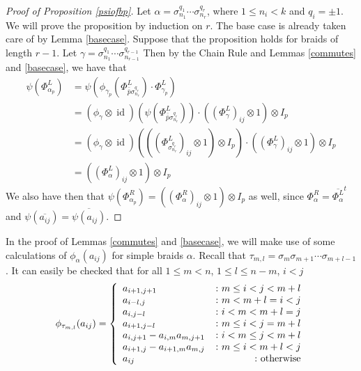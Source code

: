 \documentclass[11pt]{amsart}
\def\s{{\sigma}}
\def\fp{{\scriptstyle \bar{\bar{p}}}}
\newcommand\id{\operatorname{id}}
\theoremstyle{definition}
\begin{document}
\begin{proof} [Proof of Proposition \ref{psiofbp}]
Let $\alpha = \s_{n_1}^{q_1}\cdots\s_{n_r}^{q_r}$, where $1\le n_i<k$ and $q_i = \pm 1$.  We will prove the proposition by induction on $r$.  The base case is already taken care of by Lemma \ref{basecase}.  Suppose that the proposition holds for braids of length $r-1$.  Let $\gamma =\s_{n_1}^{q_1}\cdots\s_{n_{r-1}}^{q_{r-1}}$ Then by the Chain Rule and Lemmas \ref{commutes} and \ref{basecase}, we have that
\begin{align*}
\psi\left(\Phi_{\alpha_p}^L\right) &= \psi\left(\phi_{\gamma_p}\left(\Phi_{\fp\s^{q_r}_{n_r}}^L\right)\cdot\Phi_{\gamma_p}^L\right)\\
&= \left(\phi_{\gamma}\otimes\id\right)\left(\psi\left(\Phi_{\fp\s^{q_r}_{n_r}}^L\right)\right)\cdot \left(\left(\Phi_{\gamma}^L\right)_{ij}\otimes 1\right)\otimes I_p\\
&= \left(\phi_{\gamma}\otimes\id\right)\left(\left(\left(\Phi_{\s_{n_r}^{q_r}}^L\right)_{ij}\otimes 1\right)\otimes I_p\right)\cdot \left(\left(\Phi_{\gamma}^L\right)_{ij}\otimes 1\right)\otimes I_p\\
&= \left(\left(\Phi_{\alpha}^L\right)_{ij}\otimes 1\right)\otimes I_p
\end{align*}
We also have then that $\psi\left(\Phi_{\alpha_p}^R\right) = \left(\left(\Phi_{\alpha}^R\right)_{ij}\otimes 1\right)\otimes I_p$ as well, since $\Phi_\alpha^R = \overline{\Phi_\alpha^L}^t$ and $\psi(\overline{a_{ij}}) = \overline{\psi(a_{ij})}$.
\end{proof}


In the proof of Lemmas \ref{commutes} and \ref{basecase}, we will make use of some calculations of $\phi_\alpha(a_{ij})$ for simple braids $\alpha$.  Recall that $\tau_{m,l} = \s_m\s_{m+1}\cdots\s_{m+l-1}$.  It can easily be checked that for all $1\le m < n$, $1\le l \le n - m$, $i<j$
\begin{equation}\label{tau}
\phi_{\tau_{m,l}}(a_{ij}) =
\left\{
     \begin{array}{lr}
       a_{i+1,j+1} & \colon m\le i<j< m+l\\
       a_{i-l,j} & \colon m<m+l=i<j\\
       a_{i,j-l} & \colon i<m<m+l=j\\
       a_{i+1,j-l} & \colon m\le i < j = m+l\\
       a_{i,j+1}-a_{i,m}a_{m,j+1} & \colon i<m\le j< m+l\\
       a_{i+1,j}-a_{i+1,m}a_{m,j} & \colon m\le i< m+l<j\\
       a_{ij} & \colon \textnormal{otherwise}
     \end{array}
\right.
\end{equation}
\end{document}
